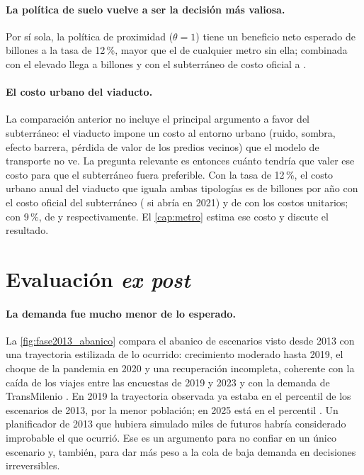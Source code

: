 \paragraph{La política de suelo vuelve a ser la decisión más valiosa.} Por sí sola, la política de
proximidad ($\theta=1$) tiene un beneficio neto esperado de \BNSinMetroTheta{} billones a la tasa de
12\,\%, mayor que el de cualquier metro sin ella; combinada con el elevado llega a \BNElevTheta{}
billones y con el subterráneo de costo oficial a \BNSubOfTheta.

\paragraph{El costo urbano del viaducto.} La comparación anterior no incluye el principal argumento a
favor del subterráneo: el viaducto impone un costo al entorno urbano (ruido, sombra, efecto barrera,
pérdida de valor de los predios vecinos) que el modelo de transporte no ve. La pregunta relevante es
entonces cuánto tendría que valer ese costo para que el subterráneo fuera preferible. Con la tasa de
12\,\%, el costo urbano anual del viaducto que iguala ambas tipologías es de \UmbralOfDoce{} billones
por año con el costo oficial del subterráneo (\UmbralOfVeintiunoDoce{} si abría en 2021) y de
\UmbralUnDoce{} con los costos unitarios; con 9\,\%, de \UmbralOfNueve{} y \UmbralUnNueve{}
respectivamente. El \cref{cap:metro} estima ese costo y discute el resultado.

\section{Evaluación \emph{ex post}}

\paragraph{La demanda fue mucho menor de lo esperado.} La \cref{fig:fase2013_abanico} compara el
abanico de escenarios visto desde 2013 con una trayectoria estilizada de lo ocurrido: crecimiento
moderado hasta 2019, el choque de la pandemia en 2020 y una recuperación incompleta, coherente con la
caída de los viajes entre las encuestas de 2019 y 2023 y con la demanda de TransMilenio
\citep{sdm2024,silla2026}. En 2019 la trayectoria observada ya estaba en el percentil
\PercentilObsPrepandemia{} de los escenarios de 2013, por la menor población; en 2025 está en el
percentil \PercentilObsFin. Un planificador de 2013 que hubiera simulado miles de futuros habría
considerado improbable el que ocurrió. Ese es un argumento para no confiar en un único escenario y,
también, para dar más peso a la cola de baja demanda en decisiones irreversibles.


